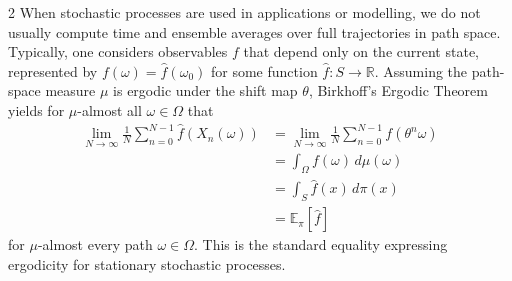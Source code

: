 \documentclass[11pt]{article}
\begin{document}
\begin{multicols}{2}
When stochastic processes are used in applications or modelling, we do not usually compute time and ensemble averages over full trajectories in path space. Typically, one considers observables $f$ that depend only on the current state, represented by $f(\omega) = \hat{f}(\omega_0)$ for some function $\hat{f}: S \to \mathbb{R}$. Assuming the path-space measure $\mu$ is ergodic under the shift map $\theta$, Birkhoff's Ergodic Theorem yields for $\mu$-almost all $\omega\in\Omega$ that
\begin{align}
\nonumber \lim_{N \to \infty} \frac{1}{N} \sum_{n=0}^{N-1} \hat{f}(X_n(\omega)) &= \lim_{N \to \infty} \frac{1}{N} \sum_{n=0}^{N-1} f(\theta^n \omega) \\
\nonumber & = \int_{\Omega} f(\omega) \, d\mu(\omega) \\
\nonumber & = \int_{S} \hat{f}(x) \, d\pi(x)\\
\label{eq-time-space-avg} &  = \mathbb{E}_{\pi}[\hat{f}]
\end{align}
for $\mu$-almost every path $\omega \in \Omega$. This is the standard equality expressing ergodicity for stationary stochastic processes.


\end{multicols}
\end{document}
